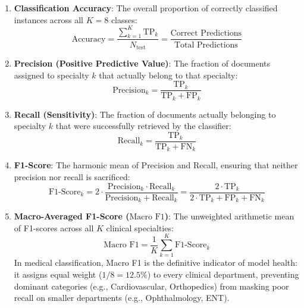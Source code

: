 \begin{enumerate}
    \item \textbf{Classification Accuracy}: The overall proportion of correctly classified instances across all $K = 8$ classes:
    \begin{equation}
        \text{Accuracy} = \frac{\sum_{k=1}^{K} \text{TP}_k}{N_{\text{test}}} = \frac{\text{Correct Predictions}}{\text{Total Predictions}}
    \end{equation}

    \item \textbf{Precision (Positive Predictive Value)}: The fraction of documents assigned to specialty $k$ that actually belong to that specialty:
    \begin{equation}
        \text{Precision}_k = \frac{\text{TP}_k}{\text{TP}_k + \text{FP}_k}
    \end{equation}

    \item \textbf{Recall (Sensitivity)}: The fraction of documents actually belonging to specialty $k$ that were successfully retrieved by the classifier:
    \begin{equation}
        \text{Recall}_k = \frac{\text{TP}_k}{\text{TP}_k + \text{FN}_k}
    \end{equation}

    \item \textbf{F1-Score}: The harmonic mean of Precision and Recall, ensuring that neither precision nor recall is sacrificed:
    \begin{equation}
        \text{F1-Score}_k = 2 \cdot \frac{\text{Precision}_k \cdot \text{Recall}_k}{\text{Precision}_k + \text{Recall}_k} = \frac{2 \cdot \text{TP}_k}{2 \cdot \text{TP}_k + \text{FP}_k + \text{FN}_k}
    \end{equation}

    \item \textbf{Macro-Averaged F1-Score ($\text{Macro F1}$)}: The unweighted arithmetic mean of F1-scores across all $K$ clinical specialties:
    \begin{equation}
        \text{Macro F1} = \frac{1}{K} \sum_{k=1}^{K} \text{F1-Score}_k
    \end{equation}
    In medical classification, Macro F1 is the definitive indicator of model health: it assigns equal weight ($1/8 = 12.5\%$) to every clinical department, preventing dominant categories (e.g., Cardiovascular, Orthopedics) from masking poor recall on smaller departments (e.g., Ophthalmology, ENT).
\end{enumerate}

